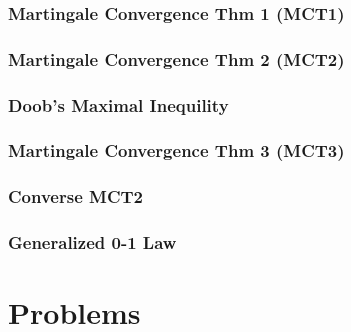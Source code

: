 \documentclass[a4paper,12pt,twoside]{book}
\begin{document}
\subsection{Martingale Convergence Thm 1 (MCT1)}

\subsection{Martingale Convergence Thm 2 (MCT2)}

\subsection{Doob's Maximal Inequility}

\subsection{Martingale Convergence Thm 3 (MCT3)}

\subsection{Converse MCT2}

\subsection{Generalized 0-1 Law}





\chapter{Problems}
\end{document}
